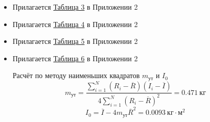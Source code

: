 \begin{itemize}
    \item Прилагается \hyperlink{table3}{Таблица 3} в Приложении 2
    \item Прилагается \hyperlink{table4}{Таблица 4} в Приложении 2
    \item Прилагается \hyperlink{table5}{Таблица 5} в Приложении 2
    \item Прилагается \hyperlink{table6}{Таблица 6} в Приложении 2

    Расчёт по методу наименьших квадратов $m_\text{ут}$ и $I_0$ \\
    \[
        m_\text{ут} = \frac{\sum_{i=1}^{N} \left( R_i - \overline{R} \right) \left( I_i - \overline{I} \right)}{4\sum_{i=1}^{N} \left( R_i - \overline{R} \right)^2} = 0.471 \ \text{кг}
    \]
    \[
        I_0 = \overline{I} - 4m_{\text{ут}}\overline{R}^2 = 0.0093 \ \text{кг} \cdot \text{м}^2
    \]
\end{itemize}